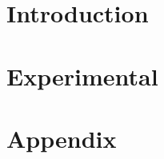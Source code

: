 \documentclass{classes/report}
\begin{document}
    \maketitle
    \newpage
    
    \begin{multicols}{2}
    
        \section{Introduction}
    
            
            
        \section{Experimental}
        
            
        
            
            
        
        
        \printbibliography[
            heading=bibintoc,
            title={References}
        ]

        
    \end{multicols}
    \newpage
      
    \appendix
    \section{Appendix}
    
        
    
        
\end{document}
